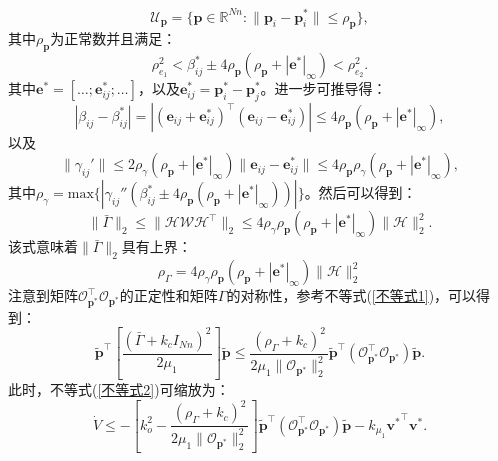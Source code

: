 \begin{equation}
	\mathcal{U}_\mathbf{p} = 
	\{
		\mathbf{p} \in \mathbb{R}^{Nn}:\|\mathbf{p}_i-\mathbf{p}_i^*\|
		\le \rho_\mathbf{p}
	\},
\end{equation}
其中$\rho_\mathbf{p}$为正常数并且满足：
\begin{equation}
	\rho_{e_1}^2 < \beta_{ij}^* \pm 4\rho_\mathbf{p}
	(\rho_\mathbf{p}+|\mathbf{e}^*|_\infty) <\rho_{e_2}^2.
	\label{初值邻域条件}
\end{equation}
其中$\mathbf{e}^*=[\dots;\mathbf{e}^*_{ij};\dots]$，以及$\mathbf{e}_{ij}^*=\mathbf{p}_i^*-\mathbf{p}_j^*$。进一步可推导得：
\begin{equation}
	|\beta_{ij}-\beta_{ij}^*| = 
	|(\mathbf{e}_{ij}+\mathbf{e}^*_{ij})^\top(\mathbf{e}_{ij}-\mathbf{e}^*_{ij})| \le 
	4\rho_\mathbf{p}
	(\rho_\mathbf{p}+|\mathbf{e}^*|_\infty),
\end{equation}
以及
\begin{equation}
	\|\gamma_{ij}'\| \le
	2\rho_\gamma(\rho_\mathbf{p}+|\mathbf{e}^*|_\infty)
	\|\mathbf{e}_{ij}-\mathbf{e}^*_{ij}\| \le
	4\rho_\mathbf{p} \rho_\gamma
	(\rho_\mathbf{p}+|\mathbf{e}^*|_\infty),
\end{equation}
其中$\rho_\gamma=\text{max}\{|\gamma_{ij}''(\beta_{ij}^*\pm4\rho_\mathbf{p}(\rho_\mathbf{p}+|\mathbf{e}^*|_\infty))|\}$。然后可以得到：
\begin{equation}
	\|\bar{\Gamma}\|_2 \le
	\|\mathcal{H}\mathcal{W}\mathcal{H}^\top\|_2 \le
	4 \rho_\gamma \rho_\mathbf{p}
	(\rho_\mathbf{p}+|\mathbf{e}^*|_\infty)\|\mathcal{H}\|^2_2.
\end{equation}
该式意味着$\|\bar{\Gamma}\|_2$具有上界：
\begin{equation}
	\rho_\Gamma = 
	4\rho_\gamma \rho_\mathbf{p} 
	(\rho_\mathbf{p}+|\mathbf{e}^*|_\infty)\|\mathcal{H}\|^2_2
\end{equation}
注意到矩阵$\mathcal{O}_{\mathbf{p}^*}^\top \mathcal{O}_{\mathbf{p}^*}$的正定性和矩阵$\Gamma$的对称性，参考不等式(\ref{不等式1})，可以得到：
\begin{equation}
	\tilde{\mathbf{p}}^\top
	\left[
		\frac{(\bar{\Gamma}+k_c I_{Nn})^2}
		{2 \mu_1}
	\right]
	\tilde{\mathbf{p}}
	\le
	\frac{(\rho_\Gamma+k_c)^2}
	{2\mu_1 \|\mathcal{O}_{\mathbf{p}^*}\|^2_2}
	\tilde{\mathbf{p}}^\top
	(\mathcal{O}_{\mathbf{p}^*}^\top \mathcal{O}_{\mathbf{p}^*})
	\tilde{\mathbf{p}}.
\end{equation}
此时，不等式(\ref{不等式2})可缩放为：
\begin{equation}
	\dot{V} \le
	-\left[
		k_o^2 -
		\frac{(\rho_\Gamma+k_c)^2}
		{2\mu_1 \|\mathcal{O}_{\mathbf{p}^*}\|^2_2}
	\right]
	\tilde{\mathbf{p}}^\top
	(\mathcal{O}_{\mathbf{p}^*}^\top \mathcal{O}_{\mathbf{p}^*})
	\tilde{\mathbf{p}}
	-k_{\mu_1}
	{\mathbf{v}^*}^\top {\mathbf{v}^*}.
\end{equation}
